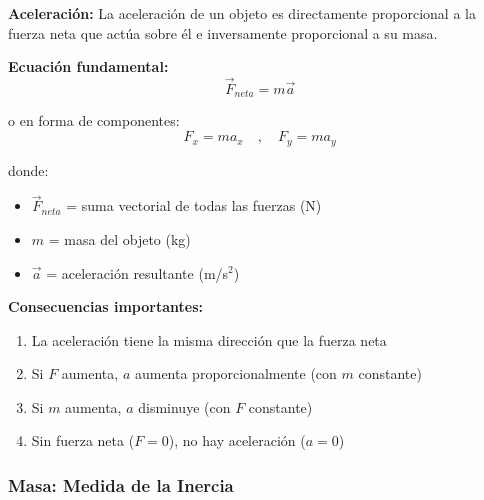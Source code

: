\begin{seccion}
\begin{definicion}
    \textbf{Aceleración:} La aceleración de un objeto es directamente proporcional a la fuerza neta que actúa sobre él e inversamente proporcional a su masa.
\end{definicion}

\begin{ecuacion}
\textbf{Ecuación fundamental:}
$$\vec{F}_{neta} = m\vec{a}$$

o en forma de componentes:
$$F_x = ma_x \quad , \quad F_y = ma_y$$

donde:
\begin{itemize}
    \item $\vec{F}_{neta}$ = suma vectorial de todas las fuerzas (N)
    \item $m$ = masa del objeto (kg)
    \item $\vec{a}$ = aceleración resultante (m/s$^2$)
\end{itemize}
\end{ecuacion}

\textbf{Consecuencias importantes:}
\begin{enumerate}
    \item La aceleración tiene la misma dirección que la fuerza neta
    \item Si $F$ aumenta, $a$ aumenta proporcionalmente (con $m$ constante)
    \item Si $m$ aumenta, $a$ disminuye (con $F$ constante)
    \item Sin fuerza neta ($F = 0$), no hay aceleración ($a = 0$)
\end{enumerate}
\end{seccion}

\subsubsection{Masa: Medida de la Inercia}

